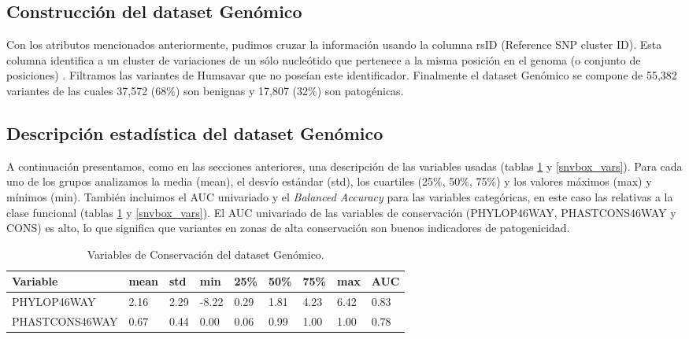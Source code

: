 
\subsection{Construcción del dataset Genómico}

Con los atributos mencionados anteriormente, pudimos cruzar la información usando la columna rsID (Reference SNP cluster ID). Esta columna identifica a un cluster de variaciones de un sólo nucleótido que pertenece a la misma posición en el genoma (o conjunto de posiciones) \cite{Ostell2007}. Filtramos las variantes de Humsavar que no poseían este identificador. Finalmente el dataset Genómico se compone de 55,382 variantes de las cuales 37,572 (68\%) son benignas y 17,807 (32\%) son patogénicas. 

\subsection{Descripción estadística del dataset Genómico}

A continuación presentamos, como en las secciones anteriores, una descripción de las variables usadas (tablas \ref{conservacion_vars} y \ref{snvbox_vars}). Para cada uno de los grupos analizamos la media (mean), el desvío estándar (std), los cuartiles (25\%, 50\%, 75\%) y los valores máximos (max) y mínimos (min). También incluimos el AUC univariado y el \textit{Balanced Accuracy} para las variables categóricas, en este caso las relativas a la clase funcional (tablas \ref{conservacion_vars} y \ref{snvbox_vars}). El AUC univariado de las variables de conservación (PHYLOP46WAY, PHASTCONS46WAY y CONS) es alto, lo que significa que variantes en zonas de alta conservación son buenos indicadores de patogenicidad.

\begin{table}[H]
\centering
\begin{tabular}{|l|l|l|l|l|l|l|l|l|}
\hline
Variable & mean & std & min & 25\%  & 50\% & 75\%  & max & AUC \\ \hline
PHYLOP46WAY & 2.16 &  2.29 & -8.22 &  0.29 &  1.81 &  4.23 &  6.42 & 0.83 \\ \hline
PHASTCONS46WAY & 0.67 & 0.44 &  0.00 &  0.06 &  0.99 &  1.00 &  1.00 & 0.78 \\ \hline
\end{tabular}
\caption{Variables de Conservación del dataset Genómico.}
\label{conservacion_vars}
\end{table}

